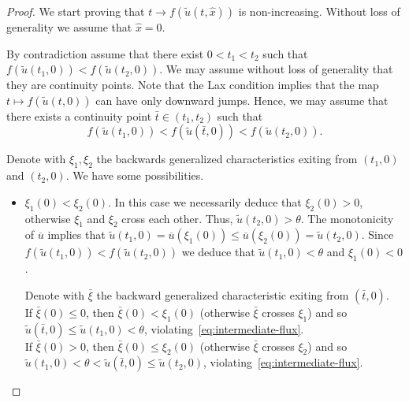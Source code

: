 \documentclass[a4paper, 10pt, final]{article}
\begin{document}
\begin{proof}
We start proving that $t\to f(\widetilde u(t, \hat x))$ is non-increasing.   Without loss of generality we assume 
that $\hat{x} = 0$.

  By contradiction assume that there exist $0 < t_1 < t_2$ such that
  $f(\widetilde{u}(t_1, 0)) < f(\widetilde{u}(t_2, 0))$. We may assume without loss of generality that they are continuity points. 
  Note that the Lax condition implies that the map $t \mapsto f(\widetilde{u}(t, 0))$
  can have only downward jumps. Hence, we may assume that there exists  a continuity point $\bar t \in (t_1, t_2)$ such that 
      \begin{equation}
        \label{eq:intermediate-flux}
        f(\widetilde{u}(t_1, 0)) < f(\widetilde{u}(\bar t, 0)) < f(\widetilde{u}(t_2, 0)). 
      \end{equation}
 
  
  Denote with $\xi_1, \xi_2$ the backwards generalized characteristics exiting from
  $(t_1, 0)$ and $(t_2, 0)$. We have some possibilities.
  \begin{itemize}
      \item[(i)] $\xi_1(0) < \xi_2(0)$. In this case we necessarily deduce that $\xi_2(0) > 0$, otherwise
      $\xi_1$ and $\xi_2$ cross each other. Thus, $\widetilde{u}(t_2, 0) > \theta$.
      The monotonicity of $\overline u$ implies that
      $\widetilde{u}(t_1, 0) = \overline u(\xi_1(0)) \le \overline u(\xi_2(0)) = \widetilde{u}(t_2, 0)$.
      Since $f(\widetilde{u}(t_1, 0)) < f(\widetilde{u}(t_2, 0))$ we deduce that
      $\widetilde{u}(t_1, 0) < \theta$ and $\xi_1(0) < 0$.

      
      Denote with $\bar \xi$ the backward generalized characteristic exiting from $(\bar t, 0)$.\\
      If $\bar \xi(0) \le 0$, then $\bar \xi(0) < \xi_1(0)$ (otherwise $\bar \xi$ crosses $\xi_1$)
      and so $\widetilde{u}(\bar t, 0) \le \widetilde{u}(t_1, 0)<\theta $, 
      violating~\eqref{eq:intermediate-flux}.\\
      If $\bar \xi(0) > 0$, then $\bar \xi(0) \le \xi_2(0)$ (otherwise $\bar \xi$ crosses $\xi_2$)
      and so $\widetilde{u}(t_1, 0) < \theta < \widetilde{u}(\bar t, 0) \le \widetilde{u}(t_2, 0)$, 
      violating~\eqref{eq:intermediate-flux}.


\end{itemize}
\end{proof}
\end{document}
